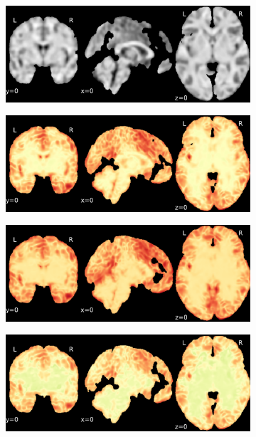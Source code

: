 \documentclass{article}
\begin{document}
\begin{appendices}
\begin{landscape}
\begin{figure}
            \begin{subfigure}[t]{0.2\paperheight}
                \centering
                \includegraphics[width=\textwidth]{figures/sig/5mm/ieee_ds000256_sub-CTS210.pdf}
            \end{subfigure}
            \begin{subfigure}[t]{0.2\paperheight}
                \centering
                \includegraphics[width=\textwidth]{figures/sig/5mm/rr_ds000256_sub-CTS210_sig.pdf}
            \end{subfigure}
            \begin{subfigure}[t]{0.2\paperheight}
                \centering
                \includegraphics[width=\textwidth]{figures/sig/5mm/rs_ds000256_sub-CTS210_sig.pdf}
            \end{subfigure}
            \begin{subfigure}[t]{0.2\paperheight}
                \centering
                \includegraphics[width=\textwidth]{figures/sig/5mm/rr.rs_ds000256_sub-CTS210_sig.pdf}

\end{subfigure}
\end{figure}
\end{landscape}
\end{appendices}
\end{document}
